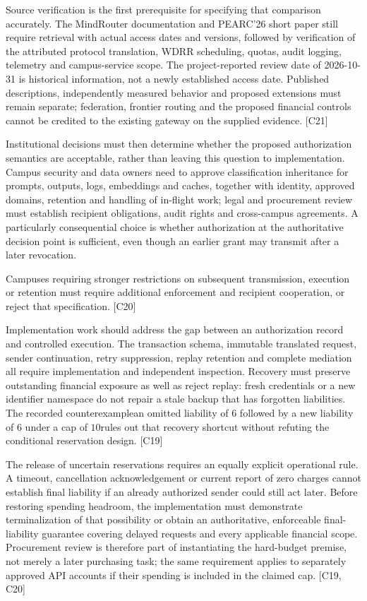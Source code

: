 \documentclass[11pt]{article}
\begin{document}
Source verification is the first prerequisite for specifying that comparison accurately. The MindRouter documentation and PEARC\textquoteright{}26 short paper still require retrieval with actual access dates and versions, followed by verification of the attributed protocol translation, WDRR scheduling, quotas, audit logging, telemetry and campus-service scope. The project-reported review date of 2026-10-31 is historical information, not a newly established access date. Published descriptions, independently measured behavior and proposed extensions must remain separate; federation, frontier routing and the proposed financial controls cannot be credited to the existing gateway on the supplied evidence. [C21]

Institutional decisions must then determine whether the proposed authorization semantics are acceptable, rather than leaving this question to implementation. Campus security and data owners need to approve classification inheritance for prompts, outputs, logs, embeddings and caches, together with identity, approved domains, retention and handling of in-flight work; legal and procurement review must establish recipient obligations, audit rights and cross-campus agreements. A particularly consequential choice is whether authorization at the authoritative decision point is sufficient, even though an earlier grant may transmit after a later revocation.

Campuses requiring stronger restrictions on subsequent transmission, execution or retention must require additional enforcement and recipient cooperation, or reject that specification. [C20]

Implementation work should address the gap between an authorization record and controlled execution. The transaction schema, immutable translated request, sender continuation, retry suppression, replay retention and complete mediation all require implementation and independent inspection. Recovery must preserve outstanding financial exposure as well as reject replay: fresh credentials or a new identifier namespace do not repair a stale backup that has forgotten liabilities. The recorded counterexample\textemdash{}an omitted liability of $6$ followed by a new liability of $6$ under a cap of $10$\textemdash{}rules out that recovery shortcut without refuting the conditional reservation design. [C19]

The release of uncertain reservations requires an equally explicit operational rule. A timeout, cancellation acknowledgement or current report of zero charges cannot establish final liability if an already authorized sender could still act later. Before restoring spending headroom, the implementation must demonstrate terminalization of that possibility or obtain an authoritative, enforceable final-liability guarantee covering delayed requests and every applicable financial scope. Procurement review is therefore part of instantiating the hard-budget premise, not merely a later purchasing task; the same requirement applies to separately approved API accounts if their spending is included in the claimed cap. [C19, C20]
\end{document}
